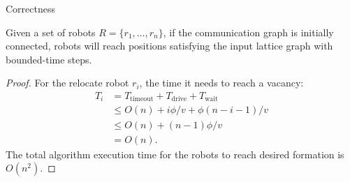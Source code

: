 \begin{frame}{Correctness}
  \begin{theorem}
    Given a set of robots $R =\{r_1, \ldots, r_n\}$, if the
    communication graph is initially connected, robots will reach
    positions satisfying the input lattice graph with bounded-time steps.
  \end{theorem}
  \begin{proof}
    For the relocate robot $r_i$, the time it needs to reach a vacancy: 
    \begin{equation*}
      \begin{split}
        T_i & = T_{\textrm{timeout}} + T_{\textrm{drive}} + T_{\textrm{wait}}  \\
        & \leq O(n)+ i\phi/v + \phi(n-i-1)/v \\
        & \leq O(n) + (n-1)\phi/v\\
        & = O(n).
      \end{split}
    \end{equation*}
    The total algorithm execution time for the robots to reach desired formation is $O(n^2)$.
  \end{proof}
\end{frame}